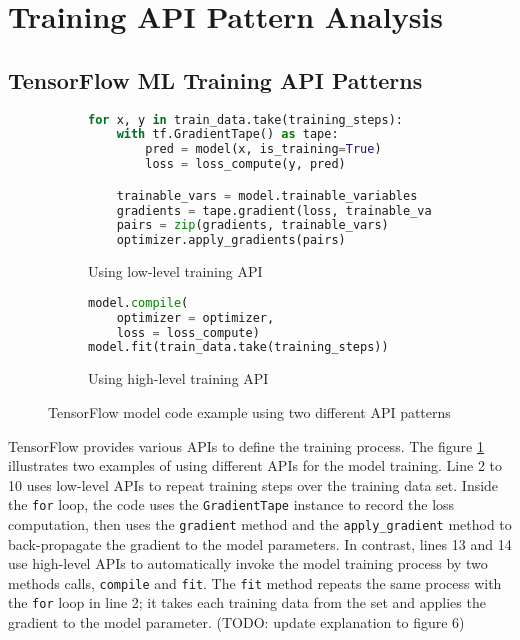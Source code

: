 \section{Training API Pattern Analysis}\label{sec:pattern}

\subsection{TensorFlow ML Training API Patterns}

\begin{figure}[ht!]
\centering
  \begin{subfigure}[b]{0.4\textwidth}
    \begin{lstlisting}[language=Python]
for x, y in train_data.take(training_steps):
    with tf.GradientTape() as tape:
        pred = model(x, is_training=True)
        loss = loss_compute(y, pred)

    trainable_vars = model.trainable_variables
    gradients = tape.gradient(loss, trainable_vars)
    pairs = zip(gradients, trainable_vars)
    optimizer.apply_gradients(pairs) 
    \end{lstlisting}
    \caption{Using low-level training API}
  \end{subfigure}
  \hspace{5mm}
  \begin{subfigure}[b]{0.45\textwidth}
    \begin{lstlisting}[language=Python]
model.compile(
    optimizer = optimizer, 
    loss = loss_compute) 
model.fit(train_data.take(training_steps))
    \end{lstlisting} 
    \caption{Using high-level training API}
  \end{subfigure}

  \caption{TensorFlow model code example using two different API patterns}
  \label{fig:pattern:ex01}
\end{figure}

TensorFlow provides various APIs to define the training process.
The figure \ref{fig:pattern:ex01} illustrates two examples of using 
different APIs for the model training.
Line 2 to 10 uses low-level APIs to repeat training steps over the training
data set. Inside the {\tt for} loop, 
the code uses the {\tt GradientTape} instance to record the loss computation,
then uses the {\tt gradient} method and the {\tt apply\_gradient} method to
back-propagate the gradient to the model parameters.
In contrast, lines 13 and 14 use high-level APIs to automatically
invoke the model training process by two methods calls, {\tt compile} and
{\tt fit}. The {\tt fit} method repeats the same process with the {\tt for}
loop in line 2; it takes each training data from the set and
applies the gradient to the model parameter.
(TODO: update explanation to figure 6)

